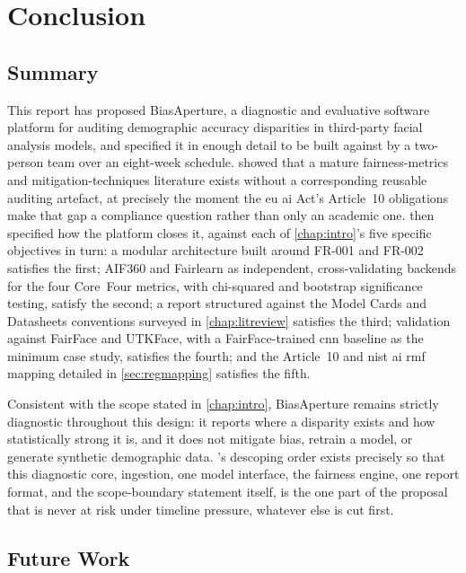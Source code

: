 \chapter{Conclusion}
\label{chap:conclusion}

\section{Summary}

This report has proposed BiasAperture, a diagnostic and evaluative software platform for auditing demographic accuracy disparities in third-party facial analysis models, and specified it in enough detail to be built against by a two-person team over an eight-week schedule.  showed that a mature fairness-metrics and mitigation-techniques literature exists without a corresponding reusable auditing artefact, at precisely the moment the \gls{eu} \gls{ai} Act's Article~10 obligations make that gap a compliance question rather than only an academic one.  then specified how the platform closes it, against each of \cref{chap:intro}'s five specific objectives in turn: a modular architecture built around FR-001 and FR-002 satisfies the first; AIF360 and Fairlearn as independent, cross-validating backends for the four Core~Four metrics, with chi-squared and bootstrap significance testing, satisfy the second; a report structured against the Model Cards and Datasheets conventions surveyed in \cref{chap:litreview} satisfies the third; validation against FairFace and UTKFace, with a FairFace-trained \gls{cnn} baseline as the minimum case study, satisfies the fourth; and the Article~10 and \gls{nist} \gls{ai} \gls{rmf} mapping detailed in \cref{sec:regmapping} satisfies the fifth.

Consistent with the scope stated in \cref{chap:intro}, BiasAperture remains strictly diagnostic throughout this design: it reports where a disparity exists and how statistically strong it is, and it does not mitigate bias, retrain a model, or generate synthetic demographic data. 's descoping order exists precisely so that this diagnostic core, ingestion, one model interface, the fairness engine, one report format, and the scope-boundary statement itself, is the one part of the proposal that is never at risk under timeline pressure, whatever else is cut first.

\section{Future Work}

